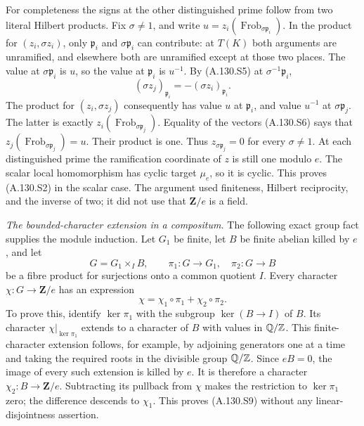 For completeness the signs at the other distinguished
prime follow from two literal Hilbert products.
Fix \(\sigma\ne1\), and write
\(u=z_i(\operatorname{Frob}_{\sigma\mathfrak p_i})\).
In the product for \((z_i,\sigma z_i)\), only
\(\mathfrak p_i\) and \(\sigma\mathfrak p_i\) can contribute:
at \(T(K)\) both arguments are unramified, and elsewhere
both are unramified except at those two places.
The value at \(\sigma\mathfrak p_i\) is \(u\), so the value
at \(\mathfrak p_i\) is \(u^{-1}\).
By (A.130.S5) at \(\sigma^{-1}\mathfrak p_i\),
\[
       (\sigma z_j)_{\mathfrak p_i}
                         =-(\sigma z_i)_{\mathfrak p_i}.
 \tag{A.130.S7}
\]
The product for \((z_i,\sigma z_j)\) consequently has value
\(u\) at \(\mathfrak p_i\), and value \(u^{-1}\) at
\(\sigma\mathfrak p_j\).
The latter is exactly
\(z_i(\operatorname{Frob}_{\sigma\mathfrak p_j})\).
Equality of the vectors (A.130.S6) says that
\(z_j(\operatorname{Frob}_{\sigma\mathfrak p_j})=u\).
Their product is one.  Thus
\(z_{\sigma\mathfrak p_j}=0\) for every \(\sigma\ne1\).
At each distinguished prime the ramification coordinate
of \(z\) is still one modulo \(e\).
The scalar local homomorphism has cyclic target \(\mu_e\),
so it is cyclic.  This proves (A.130.S2) in the scalar case.
The argument used finiteness, Hilbert reciprocity, and the
inverse of two; it did not use that \(\mathbf Z/e\) is a field.

\emph{The bounded-character extension in a compositum.}
The following exact group fact supplies the module induction.
Let \(G_1\) be finite, let \(B\) be finite abelian killed by \(e\),
and let
\[
 G=G_1\times_I B,\qquad
       \pi_1:G\longrightarrow G_1,\quad\pi_2:G\longrightarrow B
 \tag{A.130.S8}
\]
be a fibre product for surjections onto a common quotient \(I\).
Every character \(\chi:G\to\mathbf Z/e\) has an expression
\[
                 \chi=\chi_1\circ\pi_1+\chi_2\circ\pi_2.
 \tag{A.130.S9}
\]
To prove this, identify \(\ker\pi_1\) with the subgroup
\(\ker(B\to I)\) of \(B\).
Its character \(\chi|_{\ker\pi_1}\) extends to a character
of \(B\) with values in \(\mathbb Q/\mathbb Z\).
This finite-character extension follows, for example, by
adjoining generators one at a time and taking the required
roots in the divisible group \(\mathbb Q/\mathbb Z\).
Since \(eB=0\), the image of every such extension is killed
by \(e\).  It is therefore a character \(\chi_2:B\to\mathbf Z/e\).
Subtracting its pullback from \(\chi\) makes the restriction
to \(\ker\pi_1\) zero; the difference descends to \(\chi_1\).
This proves (A.130.S9) without any linear-disjointness assertion.


